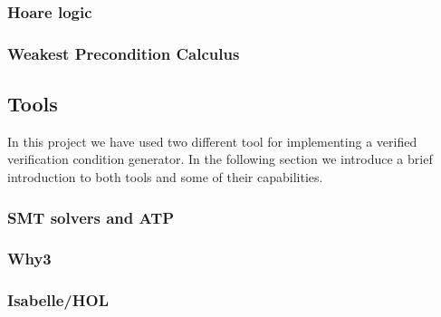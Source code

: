 \subsubsection{Hoare logic}\label{sec:hoare}


\subsubsection{Weakest Precondition Calculus}\label{sec:wp}


\subsection{Tools}
In this project we have used two different tool for implementing a verified verification condition generator.
In the following section we introduce a brief introduction to both tools and some of their capabilities.

\subsubsection{SMT solvers and ATP}


\subsubsection{Why3}\label{sec:why3}


\subsubsection{Isabelle/HOL}\label{sec:isabelle}

